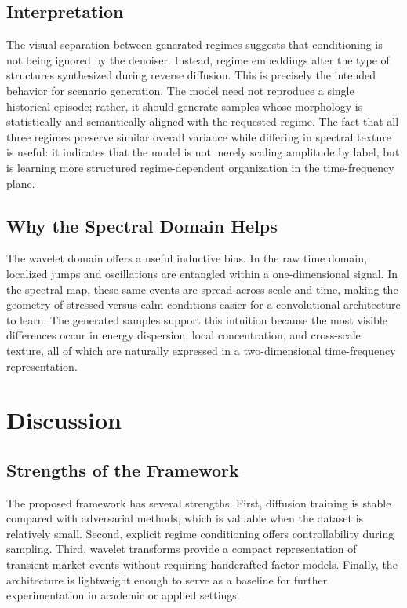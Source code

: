 \documentclass[conference]{IEEEtran}
\begin{document}
\subsection{Interpretation}
The visual separation between generated regimes suggests that conditioning is not being ignored by the denoiser. Instead, regime embeddings alter the type of structures synthesized during reverse diffusion. This is precisely the intended behavior for scenario generation. The model need not reproduce a single historical episode; rather, it should generate samples whose morphology is statistically and semantically aligned with the requested regime. The fact that all three regimes preserve similar overall variance while differing in spectral texture is useful: it indicates that the model is not merely scaling amplitude by label, but is learning more structured regime-dependent organization in the time-frequency plane.

\subsection{Why the Spectral Domain Helps}
The wavelet domain offers a useful inductive bias. In the raw time domain, localized jumps and oscillations are entangled within a one-dimensional signal. In the spectral map, these same events are spread across scale and time, making the geometry of stressed versus calm conditions easier for a convolutional architecture to learn. The generated samples support this intuition because the most visible differences occur in energy dispersion, local concentration, and cross-scale texture, all of which are naturally expressed in a two-dimensional time-frequency representation.

\section{Discussion}
\subsection{Strengths of the Framework}
The proposed framework has several strengths. First, diffusion training is stable compared with adversarial methods, which is valuable when the dataset is relatively small. Second, explicit regime conditioning offers controllability during sampling. Third, wavelet transforms provide a compact representation of transient market events without requiring handcrafted factor models. Finally, the architecture is lightweight enough to serve as a baseline for further experimentation in academic or applied settings.
\end{document}
